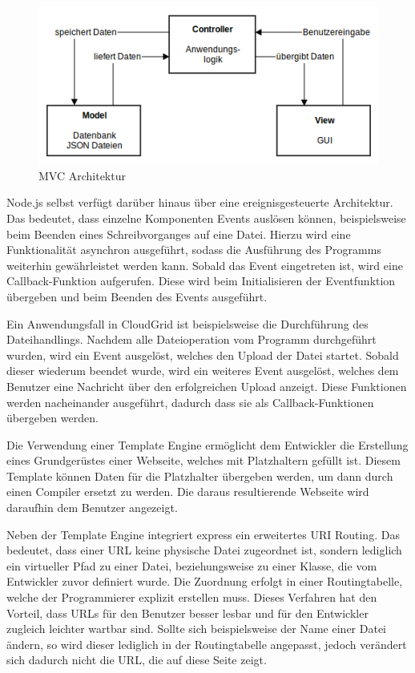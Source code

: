 \begin{figure}[H]
  \centering
  \includegraphics[scale=0.6]{resources/Bilder_Kapitel_4/mvc.png}
  \caption{MVC Architektur}
  \label{fig-mvc}
\end{figure}

Node.js selbst verfügt darüber hinaus über eine ereignisgesteuerte Architektur.
Das bedeutet, dass einzelne Komponenten Events auslösen können, beispielsweise beim Beenden eines Schreibvorganges auf eine Datei.
Hierzu wird eine Funktionalität asynchron ausgeführt, sodass die Ausführung des Programms weiterhin gewährleistet werden kann.
Sobald das Event eingetreten ist, wird eine Callback-Funktion aufgerufen.
Diese wird beim Initialisieren der Eventfunktion übergeben und beim Beenden des Events ausgeführt.

Ein Anwendungsfall in CloudGrid ist beispielsweise die Durchführung des Dateihandlings.
Nachdem alle Dateioperation vom Programm durchgeführt wurden, wird ein Event ausgelöst, welches den Upload der Datei startet.
Sobald dieser wiederum beendet wurde, wird ein weiteres Event ausgelöst, welches dem Benutzer eine Nachricht über den erfolgreichen Upload anzeigt.
Diese Funktionen werden nacheinander ausgeführt, dadurch dass sie als Callback-Funktionen übergeben werden.

Die Verwendung einer Template Engine ermöglicht dem Entwickler die Erstellung eines Grundgerüstes einer Webseite, welches mit Platzhaltern gefüllt ist.
Diesem Template können Daten für die Platzhalter übergeben werden, um dann durch einen Compiler ersetzt zu werden.
Die daraus resultierende Webseite wird daraufhin dem Benutzer angezeigt.

Neben der Template Engine integriert express ein erweitertes \ac{URI} Routing.
Das bedeutet, dass einer \ac{URL} keine physische Datei zugeordnet ist, sondern lediglich ein virtueller Pfad zu einer Datei, beziehungsweise zu einer Klasse, die vom Entwickler zuvor definiert wurde.
Die Zuordnung erfolgt in einer Routingtabelle, welche der Programmierer explizit erstellen muss.
Dieses Verfahren hat den Vorteil, dass \acp{URL} für den Benutzer besser lesbar und für den Entwickler zugleich leichter wartbar sind.
Sollte sich beispielsweise der Name einer Datei ändern, so wird dieser lediglich in der Routingtabelle angepasst, jedoch verändert sich dadurch nicht die \ac{URL}, die auf diese Seite zeigt.

